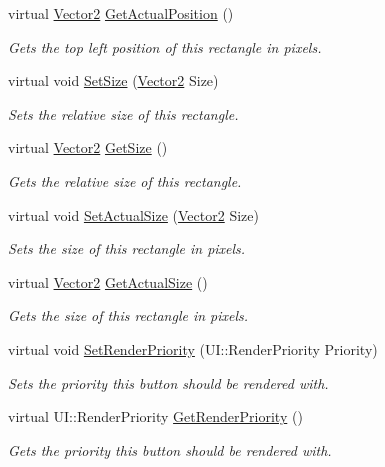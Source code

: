 \begin{DoxyCompactItemize}
virtual \hyperlink{classphys_1_1Vector2}{Vector2} \hyperlink{classphys_1_1UI_1_1Rectangle_a976f977ee23e805b4a193fc0f9e8392f}{GetActualPosition} ()
\begin{DoxyCompactList}\small\item\em Gets the top left position of this rectangle in pixels. \item\end{DoxyCompactList}\item 
virtual void \hyperlink{classphys_1_1UI_1_1Rectangle_ad199230240f116be24ddf7a85afc613f}{SetSize} (\hyperlink{classphys_1_1Vector2}{Vector2} Size)
\begin{DoxyCompactList}\small\item\em Sets the relative size of this rectangle. \item\end{DoxyCompactList}\item 
virtual \hyperlink{classphys_1_1Vector2}{Vector2} \hyperlink{classphys_1_1UI_1_1Rectangle_a5f54debc5c435cda9505b40ce82f4f24}{GetSize} ()
\begin{DoxyCompactList}\small\item\em Gets the relative size of this rectangle. \item\end{DoxyCompactList}\item 
virtual void \hyperlink{classphys_1_1UI_1_1Rectangle_acf993ac61f8f5707a4fb139d5ff6fd2e}{SetActualSize} (\hyperlink{classphys_1_1Vector2}{Vector2} Size)
\begin{DoxyCompactList}\small\item\em Sets the size of this rectangle in pixels. \item\end{DoxyCompactList}\item 
virtual \hyperlink{classphys_1_1Vector2}{Vector2} \hyperlink{classphys_1_1UI_1_1Rectangle_ae29501765e3af7eac37d5ac581e77b24}{GetActualSize} ()
\begin{DoxyCompactList}\small\item\em Gets the size of this rectangle in pixels. \item\end{DoxyCompactList}\item 
virtual void \hyperlink{classphys_1_1UI_1_1Rectangle_a59b281da90012acc64425389f2aea806}{SetRenderPriority} (UI::RenderPriority Priority)
\begin{DoxyCompactList}\small\item\em Sets the priority this button should be rendered with. \item\end{DoxyCompactList}\item 
virtual UI::RenderPriority \hyperlink{classphys_1_1UI_1_1Rectangle_a8445b7d0dcb2c92f29aeadac305af420}{GetRenderPriority} ()
\begin{DoxyCompactList}\small\item\em Gets the priority this button should be rendered with. \item\end{DoxyCompactList}\end{DoxyCompactItemize}
